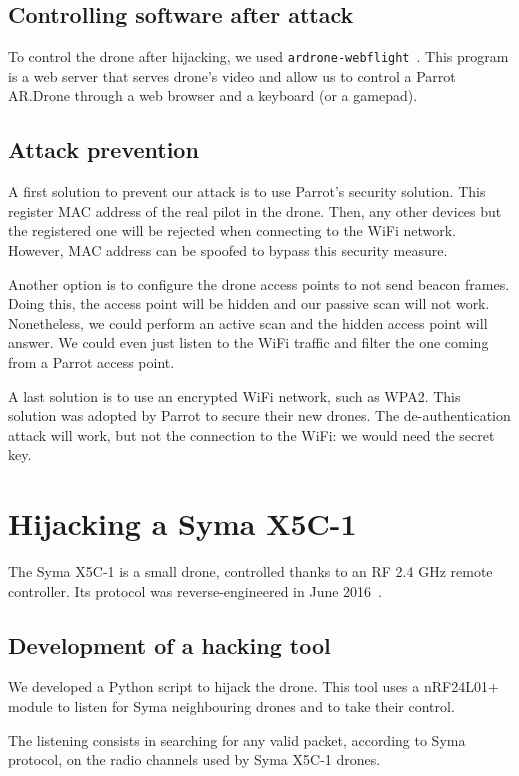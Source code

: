 \documentclass[conference,a4paper]{IEEEtran}
\newcommand{\myv}[1]{\texttt{\small#1}}
\begin{document}
\subsection{Controlling software after attack}
To control the drone after hijacking, we used
\myv{ardrone-webflight}~\cite{bib:webflight}. This program is a web server that serves
drone's video and allow us to control a Parrot AR.Drone through a web browser and a
keyboard (or a gamepad).

\subsection{Attack prevention}
A first solution to prevent our attack is to use Parrot's security solution. This
register MAC address of the real pilot in the drone. Then, any other devices but the
registered one will be rejected when connecting to the WiFi network. However, MAC address
can be spoofed to bypass this security measure.

Another option is to configure the drone access points to not send beacon frames. Doing
this, the access point will be hidden and our passive scan will not work. Nonetheless, we
could perform an active scan and the hidden access point will answer. We could even just
listen to the WiFi traffic and filter the one coming from a Parrot access point.

A last solution is to use an encrypted WiFi network, such as WPA2. This solution
was adopted by Parrot to secure their new drones. The de-authentication attack will work,
but not the connection to the WiFi: we would need the secret key.



\section{Hijacking a Syma X5C-1}
The Syma X5C-1 is a small drone, controlled thanks to an RF 2.4 GHz remote controller. Its
protocol was reverse-engineered in June 2016~\cite{bib:syma}.

\subsection{Development of a hacking tool}
We developed a Python script to hijack the drone. This tool uses a nRF24L01+ module to
listen for Syma neighbouring drones and to take their control.

The listening consists in searching for any valid packet, according to Syma protocol, on
the radio channels used by Syma X5C-1 drones.
\end{document}
